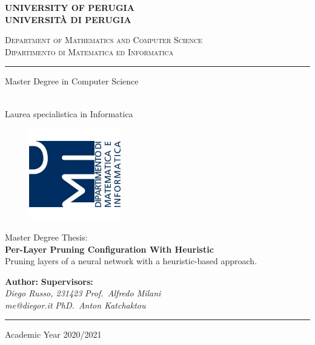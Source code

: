 \begin{titlepage}
    \begin{center}
        \textbf{\Large UNIVERSITY OF PERUGIA}\\
        \textbf{UNIVERSITÀ DI PERUGIA}
        \vspace{0.5cm}

        \scshape{Department of Mathematics and Computer Science}\\
        \scshape{Dipartimento di Matematica ed Informatica}

        \rule[1mm]{\textwidth}{0.2mm}
        \vspace{0.5cm}

        \begin{Large}Master Degree in Computer Science\end{Large}\\
        Laurea specialistica in Informatica
        \vspace{0.5cm}

        \begin{figure}[htbp]
            \begin{center}
                
                \includegraphics[width=4cm]{images/dmi_logo.png}
            \end{center}
        \end{figure}

        Master Degree Thesis:\\
        \vspace{0.5cm}
        \textbf{\LARGE Per-Layer Pruning Configuration With Heuristic}\\
        \vspace{0.3cm}
        Pruning layers of a neural network with a heuristic-based approach.\\
        \vspace{1.5cm}

        \textbf{Author:} \hfill \textbf{Supervisors:}\\
        \textit{Diego Russo, 231423} \hfill \textit{Prof.\ Alfredo Milani}\\
        \textit{me@diegor.it} \hfill \textit{PhD.\ Anton Katchaktou}

        \rule[1mm]{\textwidth}{0.2mm}
        \small{Academic Year 2020/2021}
    \end{center}
\end{titlepage}